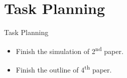 
\section{Task Planning}
\begin{frame}{Task Planning}
    \begin{itemize}
      \item Finish the simulation of 2\textsuperscript{nd} paper.
      \item Finish the outline of 4\textsuperscript{th} paper.
    \end{itemize}
\end{frame} 